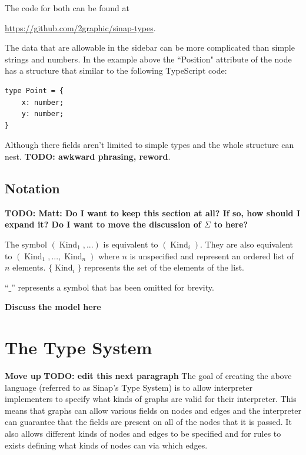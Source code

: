 \documentclass{article}
\begin{document}
The code for both can be found at 

\href{https://github.com/2graphic/sinap-types}
{https://github.com/2graphic/sinap-types}.

The data that are allowable in the sidebar can be more complicated than
simple strings and numbers. In the example above the ``Position" attribute
of the node has a structure that similar to the following TypeScript code:

\begin{samepage}
\begin{verbatim}
type Point = {
    x: number;
    y: number;
}
\end{verbatim}
\end{samepage}

Although there fields aren't limited to simple types and the 
whole structure can nest. \textbf{TODO: awkward phrasing, reword}. 

\subsection{Notation}
\textbf{TODO: Matt: Do I want to keep this section at all? If so,
how should I expand it? Do I want to move the discussion 
of \(\Sigma\) to here?}

The symbol \((\operatorname{Kind}_1, ...)\) is equivalent to 
\((\operatorname{Kind}_i)\). They are also equivalent to 
\((\operatorname{Kind}_1, ..., \operatorname{Kind}_n)\)
where \(n\) is unspecified and represent an ordered list 
of \(n\) elements. \(\{\operatorname{Kind}_i\}\) represents 
the set of the elements of the list. 

``\(\_\)'' represents a symbol that has been omitted for brevity.

\textbf{Discuss the model here}

\section{The Type System}

\textbf{Move up}
\textbf{TODO: edit this next paragraph}
The goal of creating the above language (referred to as Sinap's 
Type System) is to allow interpreter implementers to specify what 
kinds of graphs are valid for their interpreter. This means that 
graphs can allow various fields on nodes and edges and the interpreter
can guarantee that the fields are present on all of the nodes that it
is passed. It also allows different kinds of nodes and edges to be 
specified and for rules to exists defining what kinds of nodes can 
via which edges. 
\end{document}
